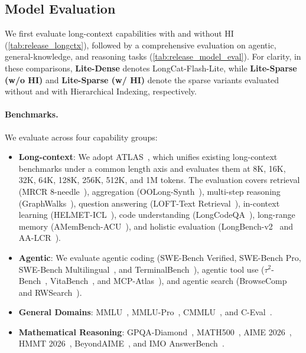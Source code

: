 \documentclass{article}
\newcommand{\longcat}{LongCat-Flash-Lite\xspace}
\begin{document}
\subsection{Model Evaluation}
\label{sec:release_eval}
We first evaluate long-context capabilities with and without HI (\cref{tab:release_longctx}), followed by a comprehensive evaluation on agentic, general-knowledge, and reasoning tasks (\cref{tab:release_model_eval}). For clarity, in these comparisons, \textbf{Lite-Dense} denotes \longcat, while \textbf{Lite-Sparse (w/o HI)} and \textbf{Lite-Sparse (w/ HI)} denote the sparse variants evaluated without and with Hierarchical Indexing, respectively.


\paragraph{Benchmarks.}
We evaluate across four capability groups:
\begin{itemize}
\item \textbf{Long-context}: We adopt ATLAS~\citep{huang2026atlas}, which unifies existing long-context benchmarks under a common length axis and evaluates them at 8K, 16K, 32K, 64K, 128K, 256K, 512K, and 1M tokens. The evaluation covers retrieval (MRCR 8-needle~\citep{openai2025mrcr}), aggregation (OOLong-Synth~\citep{bertsch2025oolong}), multi-step reasoning (GraphWalks~\citep{graphwalks}), question answering (LOFT-Text Retrieval~\citep{loft}), in-context learning (HELMET-ICL~\citep{yen2024helmet}), code understanding (LongCodeQA~\citep{rando2025longcodebench}), long-range memory (AMemBench-ACU~\citep{jiayang2026amemgym}), and holistic evaluation (LongBench-v2~\citep{bai2024longbenchv2} and AA-LCR~\citep{artificialanalysis2025lcr}).
\item \textbf{Agentic}: We evaluate agentic coding (SWE-Bench Verified, SWE-Bench Pro, SWE-Bench Multilingual~\citep{jimenez2023swebench}, and TerminalBench~\citep{merrill2026terminalbench}), agentic tool use ($\tau^2$-Bench~\citep{tau2bench}, VitaBench~\citep{he2025vitabench}, and MCP-Atlas~\citep{bandi2026mcpatlas}), and agentic search (BrowseComp~\citep{wei2025browsecomp,zhou2025browsecompzh} and RWSearch~\citep{rwsearch2026}).
\item \textbf{General Domains}: MMLU~\citep{hendrycks2021mmlu}, MMLU-Pro~\citep{wang2024mmlupro}, CMMLU~\citep{li2023cmmlu}, and C-Eval~\citep{huang2024ceval}.
\item \textbf{Mathematical Reasoning}: GPQA-Diamond~\citep{rein2024gpqa}, MATH500~\citep{hendrycks2021math}, AIME 2026~\citep{dekoninck2026matharena}, HMMT 2026~\citep{dekoninck2026matharena}, BeyondAIME~\citep{bytedance2025beyondaime}, and IMO AnswerBench~\citep{luong2025imoanswerbench}.
\end{itemize}
\end{document}
